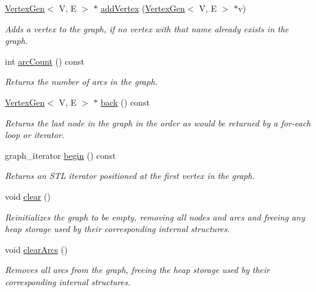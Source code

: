 \begin{DoxyCompactItemize}
\mbox{\hyperlink{classVertexGen}{Vertex\+Gen}}$<$ V, E $>$ $\ast$ \mbox{\hyperlink{classBasicGraphGen_a99facea785e991d862eef401807c5f79}{add\+Vertex}} (\mbox{\hyperlink{classVertexGen}{Vertex\+Gen}}$<$ V, E $>$ $\ast$v)
\begin{DoxyCompactList}\small\item\em Adds a vertex to the graph, if no vertex with that name already exists in the graph. \end{DoxyCompactList}\item 
int \mbox{\hyperlink{classGraph_ac0b108b3354f5222d2c829dcd639fa7a}{arc\+Count}} () const
\begin{DoxyCompactList}\small\item\em Returns the number of arcs in the graph. \end{DoxyCompactList}\item 
\mbox{\hyperlink{classVertexGen}{Vertex\+Gen}}$<$ V, E $>$ $\ast$ \mbox{\hyperlink{classGraph_a27d59ef129bb56cc144ecc81c0affd34}{back}} () const
\begin{DoxyCompactList}\small\item\em Returns the last node in the graph in the order as would be returned by a for-\/each loop or iterator. \end{DoxyCompactList}\item 
graph\+\_\+iterator \mbox{\hyperlink{classGraph_aea3a8950c46f4ac913207201b685e715}{begin}} () const
\begin{DoxyCompactList}\small\item\em Returns an S\+TL iterator positioned at the first vertex in the graph. \end{DoxyCompactList}\item 
void \mbox{\hyperlink{classGraph_ac8bb3912a3ce86b15842e79d0b421204}{clear}} ()
\begin{DoxyCompactList}\small\item\em Reinitializes the graph to be empty, removing all nodes and arcs and freeing any heap storage used by their corresponding internal structures. \end{DoxyCompactList}\item 
void \mbox{\hyperlink{classGraph_a63f0ce1806df1c8070d997153363eecb}{clear\+Arcs}} ()
\begin{DoxyCompactList}\small\item\em Removes all arcs from the graph, freeing the heap storage used by their corresponding internal structures. \end{DoxyCompactList}\item 

\end{DoxyCompactItemize}
